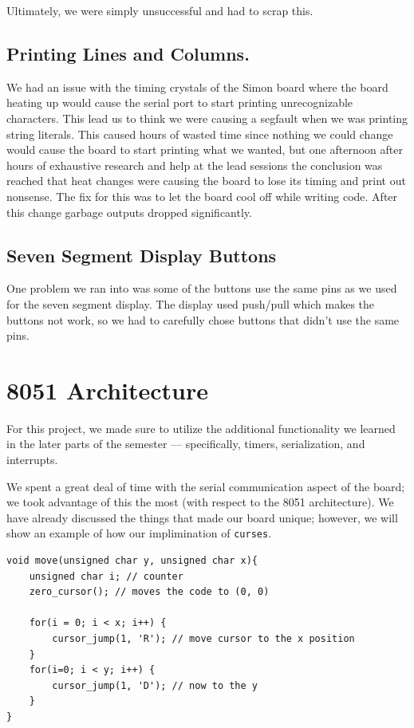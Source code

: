 \documentclass[12pt]{article}
\newcommand{\shellcmd}[1]{\texttt{\colorbox{gray!30}{#1}}}
\begin{document}
Ultimately, we were simply unsuccessful and had to scrap this.

\subsection{Printing Lines and Columns.}
We had an issue with the timing crystals of the Simon board where the board heating up would cause the serial port to start printing unrecognizable characters. This lead us to think we were causing a segfault when we was printing string literals. This caused hours of wasted time since nothing we could change would cause the board to start printing what we wanted, but one afternoon after hours of exhaustive research and help at the lead sessions the conclusion was reached that heat changes were causing the board to lose its timing and print out nonsense. The fix for this was to let the board cool off while writing code. After this change garbage outputs dropped significantly.

\subsection{Seven Segment Display Buttons}
One problem we ran into was some of the buttons use the same pins as we used for the seven segment display. The display used push/pull which makes the buttons not work, so we had to carefully chose buttons that didn't use the same pins.

\section{8051 Architecture}
For this project, we made sure to utilize the additional functionality we learned in the later parts of the semester --- specifically, timers, serialization, and interrupts.

We spent a great deal of time with the serial communication aspect of the board; we took advantage of this the most (with respect to the \num{8051} architecture). We have already discussed the things that made our board unique; however, we will show an example of how our implimination of \shellcmd{curses}.

\begin{lstlisting}[style=cC]
void move(unsigned char y, unsigned char x){
	unsigned char i; // counter
	zero_cursor(); // moves the code to (0, 0)

	for(i = 0; i < x; i++) {
		cursor_jump(1, 'R'); // move cursor to the x position
	}
	for(i=0; i < y; i++) {
		cursor_jump(1, 'D'); // now to the y
	}
}
\end{lstlisting}
\end{document}
